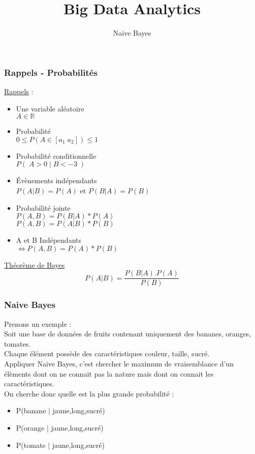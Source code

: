 \documentclass{formation}
\title{Big Data Analytics}
\subtitle{Naive Bayes}
\begin{document}
\maketitle

\begin{frame}
  \frametitle{Rappels - Probabilités}
  \begin{minipage}[c]{0.60\linewidth}
    \underline{Rappels} :
    \begin{itemize}
    \item Une variable aléatoire \\ $A\in\mathbb{R}$
    \item Probabilité \\ $0 \leq P(A\in[a_1\;a_2]) \leq 1$
    \item Probabilité conditionnelle \\ $P(\;A>0\;|\;B<-3\;)$
    \item Évènements indépendants \\ $P(A|B)=P(A)$ et $P(B|A)=P(B)$
    \item Probabilité jointe \\ $P(A,B)=P(B|A)*P(A)$ \\ $P(A,B)=P(A|B)*P(B)$
    \item A et B Indépendants \\ $\iff P(A,B) = P(A)*P(B)$ 
    \end{itemize}
  \end{minipage}\hfill
  \begin{minipage}[c]{0.39\linewidth}
    \begin{center}
      \underline{Théorème de Bayes}
      \[
      \boxed{P(A|B)=\frac{P(B|A).P(A)}{P(B)}}
      \]
    \end{center}
  \end{minipage}\hfill
\end{frame}

\begin{frame}
  \frametitle{Naive Bayes}
  Prenons un exemple : \\
  Soit une base de données de fruits contenant uniquement des bananes, oranges, tomates. \\
  Chaque élément possède des caractéristiques couleur, taille, sucré. \\
  Appliquer Naive Bayes, c'est chercher le maximum de vraisemblance d'un élèments dont on ne connait pas la nature mais dont on connait les caractéristiques. \\
  On cherche donc quelle est la plus grande probabilité :
  \begin{itemize}
  \item P(banane | jaune,long,sucré)
  \item P(orange | jaune,long,sucré)
  \item P(tomate | jaune,long,sucré)
  \end{itemize}
\end{frame}
\end{document}
